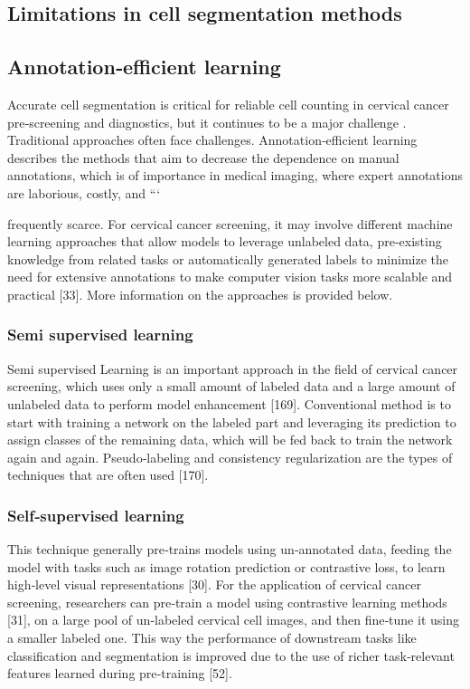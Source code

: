 \documentclass{svjour3}
\begin{document}
\subsection{Limitations in cell segmentation methods}
\subsection{Annotation‑efficient learning}
Accurate cell segmentation is critical for reliable cell counting in cervical cancer pre‑screening and diagnostics, but it continues to be a major challenge \cite{ref158}. Traditional approaches often face challenges.
Annotation‑efficient learning describes the methods that aim to decrease the dependence on manual annotations, which is of importance in medical imaging, where expert annotations are laborious, costly, and
```

frequently scarce. For cervical cancer screening, it may involve different machine learning approaches that allow models to leverage unlabeled data, pre‑existing knowledge from related tasks or automatically generated labels to minimize the need for extensive annotations to make computer vision tasks more scalable and practical [33]. More information on the approaches is provided below.
\subsubsection{Semi supervised learning}
Semi supervised Learning is an important approach in the field of cervical cancer screening, which uses only a small amount of labeled data and a large amount of unlabeled data to perform model enhancement [169]. Conventional method is to start with training a network on the labeled part and leveraging its prediction to assign classes of the remaining data, which will be fed back to train the network again and again. Pseudo‑labeling and consistency regularization are the types of techniques that are often used [170].
\subsubsection{Self‑supervised learning}
This technique generally pre‑trains models using un‑annotated data, feeding the model with tasks such as image rotation prediction or contrastive loss, to learn high‑level visual representations [30]. For the application of cervical cancer screening, researchers can pre‑train a model using contrastive learning methods [31], on a large pool of un‑labeled cervical cell images, and then fine‑tune it using a smaller labeled one. This way the performance of downstream tasks like classification and segmentation is improved due to the use of richer task‑relevant features learned during pre‑training [52].
\end{document}
